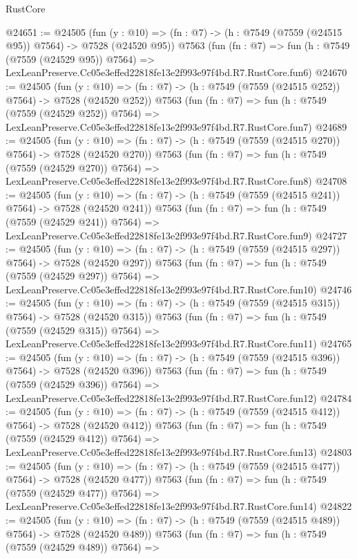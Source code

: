 \begin{lexlean}{RustCore}
\begin{coremodule}
@24651 := @24505
    (fun (y : @10) => (fn : @7) -> (h : @7549 (@7559 (@24515 @95)) @7564) -> @7528 (@24520 @95))
    @7563
    (fun (fn : @7) =>
    fun (h : @7549 (@7559 (@24529 @95)) @7564) =>
    LexLeanPreserve.Cc05e3effed22818fe13e2f993e97f4bd.R7.RustCore.fun6)
@24670 := @24505
    (fun (y : @10) => (fn : @7) -> (h : @7549 (@7559 (@24515 @252)) @7564) -> @7528 (@24520 @252))
    @7563
    (fun (fn : @7) =>
    fun (h : @7549 (@7559 (@24529 @252)) @7564) =>
    LexLeanPreserve.Cc05e3effed22818fe13e2f993e97f4bd.R7.RustCore.fun7)
@24689 := @24505
    (fun (y : @10) => (fn : @7) -> (h : @7549 (@7559 (@24515 @270)) @7564) -> @7528 (@24520 @270))
    @7563
    (fun (fn : @7) =>
    fun (h : @7549 (@7559 (@24529 @270)) @7564) =>
    LexLeanPreserve.Cc05e3effed22818fe13e2f993e97f4bd.R7.RustCore.fun8)
@24708 := @24505
    (fun (y : @10) => (fn : @7) -> (h : @7549 (@7559 (@24515 @241)) @7564) -> @7528 (@24520 @241))
    @7563
    (fun (fn : @7) =>
    fun (h : @7549 (@7559 (@24529 @241)) @7564) =>
    LexLeanPreserve.Cc05e3effed22818fe13e2f993e97f4bd.R7.RustCore.fun9)
@24727 := @24505
    (fun (y : @10) => (fn : @7) -> (h : @7549 (@7559 (@24515 @297)) @7564) -> @7528 (@24520 @297))
    @7563
    (fun (fn : @7) =>
    fun (h : @7549 (@7559 (@24529 @297)) @7564) =>
    LexLeanPreserve.Cc05e3effed22818fe13e2f993e97f4bd.R7.RustCore.fun10)
@24746 := @24505
    (fun (y : @10) => (fn : @7) -> (h : @7549 (@7559 (@24515 @315)) @7564) -> @7528 (@24520 @315))
    @7563
    (fun (fn : @7) =>
    fun (h : @7549 (@7559 (@24529 @315)) @7564) =>
    LexLeanPreserve.Cc05e3effed22818fe13e2f993e97f4bd.R7.RustCore.fun11)
@24765 := @24505
    (fun (y : @10) => (fn : @7) -> (h : @7549 (@7559 (@24515 @396)) @7564) -> @7528 (@24520 @396))
    @7563
    (fun (fn : @7) =>
    fun (h : @7549 (@7559 (@24529 @396)) @7564) =>
    LexLeanPreserve.Cc05e3effed22818fe13e2f993e97f4bd.R7.RustCore.fun12)
@24784 := @24505
    (fun (y : @10) => (fn : @7) -> (h : @7549 (@7559 (@24515 @412)) @7564) -> @7528 (@24520 @412))
    @7563
    (fun (fn : @7) =>
    fun (h : @7549 (@7559 (@24529 @412)) @7564) =>
    LexLeanPreserve.Cc05e3effed22818fe13e2f993e97f4bd.R7.RustCore.fun13)
@24803 := @24505
    (fun (y : @10) => (fn : @7) -> (h : @7549 (@7559 (@24515 @477)) @7564) -> @7528 (@24520 @477))
    @7563
    (fun (fn : @7) =>
    fun (h : @7549 (@7559 (@24529 @477)) @7564) =>
    LexLeanPreserve.Cc05e3effed22818fe13e2f993e97f4bd.R7.RustCore.fun14)
@24822 := @24505
    (fun (y : @10) => (fn : @7) -> (h : @7549 (@7559 (@24515 @489)) @7564) -> @7528 (@24520 @489))
    @7563
    (fun (fn : @7) =>
    fun (h : @7549 (@7559 (@24529 @489)) @7564) =>

\end{coremodule}
\end{lexlean}
